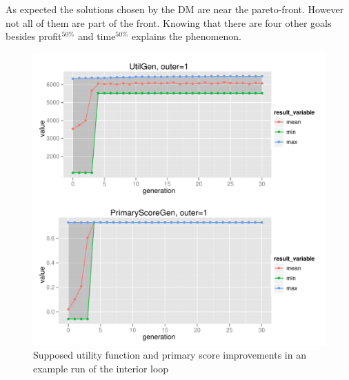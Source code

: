 As expected the solutions chosen by the DM are near the pareto-front. However
not all of them are part of the front. Knowing that there are four other goals
besides profit$^{50\%}$ and time$^{50\%}$ explains the phenomenon.

\begin{figure}
  \centering
  \includegraphics[width=1\textwidth]{exp/uncert/pres_utilgen_01}
  \caption{Supposed utility function and primary score improvements in an
    example run of the interior loop}
  \label{pres_utilgen_01}
\end{figure}

